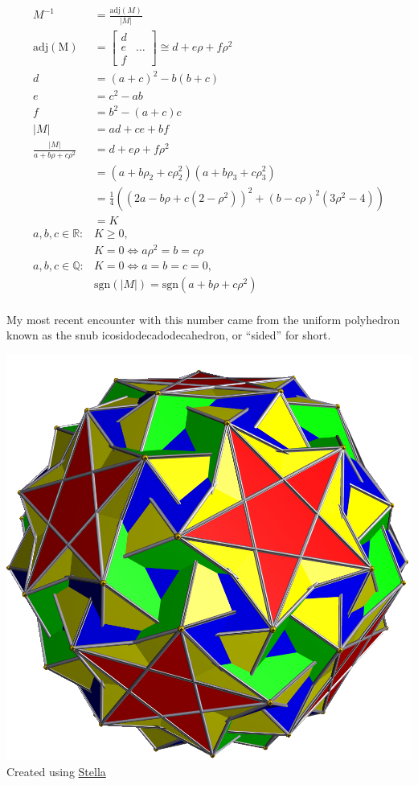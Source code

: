 \documentclass{article}
\begin{document}
\begin{align*}
  M^{-1} &= \frac{\mathrm{adj}(M)}{\lvert M \rvert} \\
  \mathrm{adj(M)} &=
  \begin{bmatrix}
    d & \\
    e & \hdots \\
    f &
  \end{bmatrix}
  \cong d+e\rho+f\rho^2 \\
  d &=
  (a+c)^2-b(b+c) \\
  e &=
  c^2-ab \\
  f &=
  b^2-(a+c)c \\
  \lvert M \rvert &= ad+ce+bf \\
  \frac{\lvert M \rvert}{a+b\rho+c\rho^2}
  &= d+e\rho+f\rho^2 \\
  &= (a+b\rho_2+c\rho_2^2)(a+b\rho_3+c\rho_3^2) \\
  &= \frac{1}{4}\left((2a-b\rho+c(2-\rho^2))^2+(b-c\rho)^2(3\rho^2-4)\right) \\
  &= K \\
  a, b, c \in \mathbb{R}: & K \geq 0, \\
  & K = 0 \iff a\rho^2 = b = c\rho \\
  a, b, c \in \mathbb{Q}: & K = 0 \iff a = b = c = 0, \\
  & \mathrm{sgn}(\lvert M \rvert) = \mathrm{sgn}(a+b\rho+c\rho^2) \\
\end{align*}

My most recent encounter with this number
came from the uniform polyhedron known as
the snub icosidodecadodecahedron, or ``sided'' for short.

\begin{center}
  \includegraphics[width=0.25\linewidth]{sided.png} \\
  Created using \href{http://www.software3d.com/Stella.php}{Stella}
\end{center}
\end{document}
